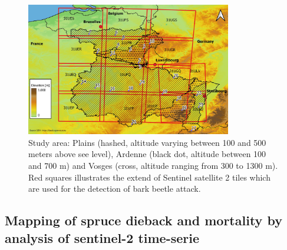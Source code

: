 \documentclass[3p,procedia]{elsarticle}
\begin{document}
\begin{figure} [htbp] 
	\centering
	\includegraphics[width=0.8\textwidth]{gde.jpeg}
	\caption{Study area: Plains (hashed, altitude varying between 100 and 500 meters above see level), Ardenne (black dot, altitude between 100 and 700 m) and Vosges (cross, altitude ranging from 300 to 1300 m). Red squares illustrates the extend of Sentinel satellite 2 tiles which are used for the detection of bark beetle attack.}
	\label{fig:situ}
\end{figure}

\subsection{Mapping of spruce dieback and mortality by analysis of sentinel-2 time-serie}
\end{document}
